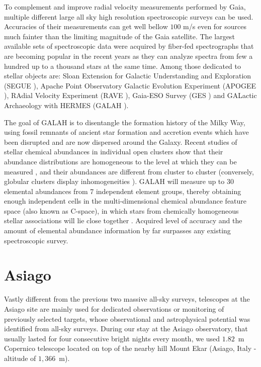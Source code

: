 To complement and improve radial velocity measurements performed by Gaia, multiple different large all sky high resolution spectroscopic surveys can be used. Accuracies of their measurements can get well bellow $100$ m/s even for sources much fainter than the limiting magnitude of the Gaia satellite. The largest available sets of spectroscopic data were acquired by fiber-fed spectrographs that are becoming popular in the recent years as they can analyze spectra from few a hundred up to a thousand stars at the same time. Among those dedicated to stellar objects are: Sloan Extension for Galactic Understanding and Exploration (SEGUE \cite{2009AJ....137.4377Y}), Apache Point Observatory Galactic Evolution Experiment (APOGEE \cite{2017AJ....154...94M}), RAdial Velocity Experiment (RAVE \cite{2017AJ....153...75K}), Gaia-ESO Survey (GES \cite{2012Msngr.147...25G}) and GALactic Archaeology with HERMES (GALAH \cite{2017MNRAS.465.3203M}).

The goal of GALAH is to disentangle the formation history of the Milky Way, using fossil remnants of ancient star formation and accretion events which have been disrupted and are now dispersed around the Galaxy. Recent studies of stellar chemical abundances in individual open clusters show that their abundance distributions are homogeneous to the level at which they can be measured \cite{2016ApJ...817...49B, 2016ApJ...833..262H}, and their abundances are different from cluster to cluster (conversely, globular clusters display inhomogeneities \cite{2007MNRAS.377..335B, 2012A&ARv..20...50G}). GALAH will measure up to 30 elemental abundances from 7 independent element groups, thereby obtaining enough independent cells in the multi-dimensional chemical abundance feature space (also known as C-space), in which stars from chemically homogeneous stellar associations will lie close together \cite{2012ASPC..458..393F}. Acquired level of accuracy and the amount of elemental abundance information by far surpasses any existing spectroscopic survey.

\section{Asiago}
\label{sec:asiago_data}
Vastly different from the previous two massive all-sky surveys, telescopes at the Asiago site are mainly used for dedicated observations or monitoring of previously selected targets, whose observational and astrophysical potential was identified from all-sky surveys. During our stay at the Asiago observatory, that usually lasted for four consecutive bright nights every month, we used $1.82$~m Copernico telescope located on top of the nearby hill Mount Ekar (Asiago, Italy - altitude of $1,366$~m).

